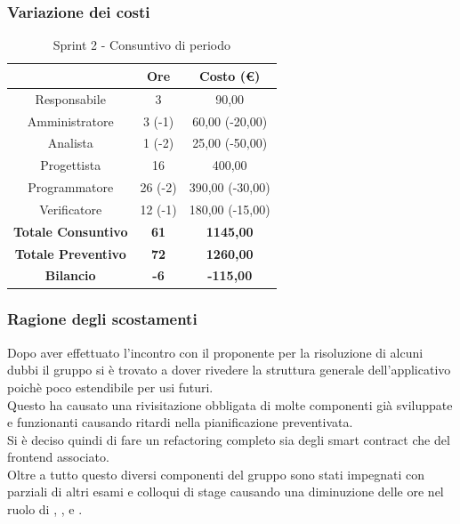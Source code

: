\subsubsection{Variazione dei costi} \label{subsubsection:variazione_costi_sprint2}

\begin{table}[H]
  \centering
  \renewcommand{\arraystretch}{1.8}
  \begin{tabular}{c|c|c}
    \rowcolor[HTML]{125E28}
    \multicolumn{1}{c}{\color[HTML]{FFFFFF}\textbf{Ruolo}} &
    \multicolumn{1}{c}{\color[HTML]{FFFFFF}\textbf{Ore}}   &
    \multicolumn{1}{c}{\color[HTML]{FFFFFF}\textbf{Costo (€)}}                              \\
    \hline
    Responsabile                                           & 3           & 90,00            \\
    Amministratore                                         & 3 (-1)      & 60,00 (-20,00)   \\
    Analista                                               & 1 (-2)      & 25,00 (-50,00)   \\
    Progettista                                            & 16          & 400,00           \\
    Programmatore                                          & 26 (-2)     & 390,00 (-30,00)  \\
    Verificatore                                           & 12 (-1)     & 180,00 (-15,00)  \\
    \textbf{Totale Consuntivo}                             & \textbf{61} & \textbf{1145,00} \\
    \textbf{Totale Preventivo}                             & \textbf{72} & \textbf{1260,00} \\
    \textbf{Bilancio}                                      & \textbf{-6} & \textbf{-115,00} \\
  \end{tabular}
  \caption{Sprint 2 - Consuntivo di periodo}
\end{table}

\subsubsection{Ragione degli scostamenti} \label{subsubsection:ragione_scostamenti_sprint2}
Dopo aver effettuato l'incontro con il proponente per la risoluzione di alcuni dubbi il gruppo si è trovato a dover rivedere la struttura generale dell'applicativo poichè poco estendibile per usi futuri.
\\Questo ha causato una rivisitazione obbligata di molte componenti già sviluppate e funzionanti causando ritardi nella pianificazione preventivata.
\\Si è deciso quindi di fare un refactoring\glo{} completo sia degli smart contract\glo{} che del frontend\glo{} associato.
\\Oltre a tutto questo diversi componenti del gruppo sono stati impegnati con parziali di altri esami e colloqui di stage causando una diminuzione delle ore nel ruolo di \roleAdministratorLow{}, \roleAnalystLow{}, \roleProgrammerLow{} e \roleVerifierLow{}.

